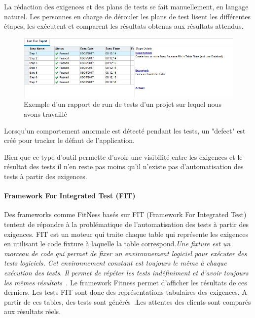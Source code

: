         La rédaction des exigences et des plans de tests se fait manuellement, en langage naturel. Les personnes en charge de dérouler les plans de test lisent les différentes étapes, les exécutent et comparent les résultats obtenus aux résultats attendus.
        
            \begin{figure}[H]
                \centering
                \includegraphics[width=\textwidth]{images/qc.png}
                \caption{Exemple d'un rapport de run de tests d'un projet sur lequel nous avons travaillé}
            \end{figure}
        
        Lorsqu’un comportement anormale est détecté pendant les tests, un "defect" est créé pour tracker le défaut de l’application.
        
        Bien que ce type d’outil permette d’avoir une visibilité entre les exigences et le résultat des tests il n’en reste pas moins qu’il n’existe pas d’automatisation des tests à partir des exigences.
        
        \paragraph{Framework For Integrated Test (FIT)}
        
        Des frameworks comme FitNess\cite{fitnesse} basés sur FIT (Framework For Integrated Test) tentent de répondre à la problématique de l’automatisation des tests à partir des exigences. FIT est un moteur qui traite chaque table qui représente les exigences en utilisant le code fixture à laquelle la table correspond.\textit{\guillemotleft Une fixture est un morceau de code qui permet de fixer un environnement logiciel pour exécuter des tests logiciels. Cet environnement constant est toujours le même à chaque exécution des tests. Il permet de répéter les tests indéfiniment et d'avoir toujours les mêmes résultats~\cite{fixture}.\guillemotright} Le framework Fitness permet d'afficher les résultats de ces derniers. Les tests FIT sont donc des représentations tabulaires des exigences. A partir de ces tables, des tests sont générés~\cite{article6}.Les attentes des clients sont comparés aux résultats réels.~\cite{fitnesse}

